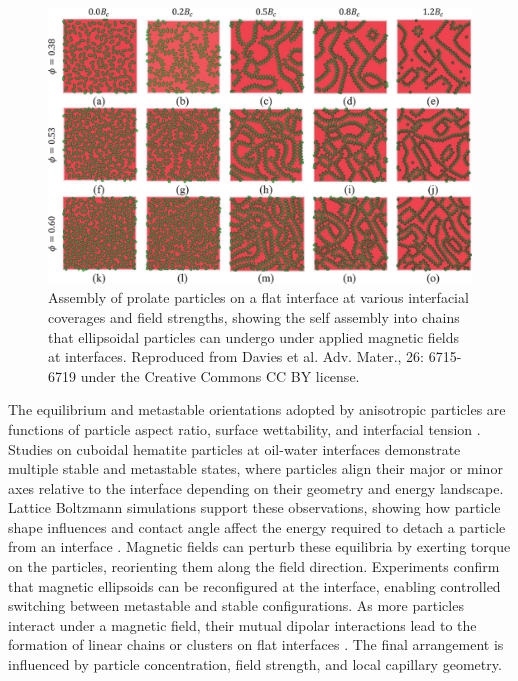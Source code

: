 \begin{figure}
    \centering
    \includegraphics[scale = 0.4]{figures/introduction/anisotropic_particles_assembly.jpg}
    \caption{Assembly of prolate particles on a flat interface at various interfacial coverages and field strengths,
             showing the self assembly into chains that ellipsoidal particles can undergo under applied magnetic fields at
             interfaces. \cite{davies_assembling_2014} Reproduced from Davies et al. Adv. Mater., 26: 6715-6719 under the 
             Creative Commons CC BY license.}
    \label{fig:anisotropic_assembly}
\end{figure}

The equilibrium and metastable orientations adopted by anisotropic particles are functions of particle aspect ratio, surface wettability, and interfacial tension 
\cite{morgan_understanding_2013, newton_influence_2014}. Studies on cuboidal hematite particles at oil-water interfaces demonstrate multiple stable and metastable states, where particles align 
their major or minor axes relative to the interface depending on their geometry and energy landscape. Lattice Boltzmann simulations support these observations, showing how particle shape influences 
and contact angle affect the energy required to detach a particle from an interface \cite{davies_detachment_2014}. 
Magnetic fields can perturb these equilibria by exerting torque on the particles, reorienting them along the field direction. 
Experiments confirm that magnetic ellipsoids can be reconfigured at the interface, enabling controlled switching between metastable and stable configurations.
As more particles interact under a magnetic field, their mutual dipolar interactions lead to the formation of linear chains or clusters on flat interfaces 
\cite{davies_assembling_2014, newton_capillary_2018}. The final arrangement is influenced by particle concentration, field strength, and local capillary geometry. 

